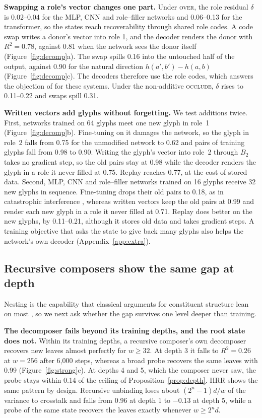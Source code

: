 \documentclass[10pt]{article}
\theoremstyle{plain}
\theoremstyle{remark}
\begin{document}
\textbf{Swapping a role's vector changes one part.} Under \textsc{over}, the role residual $\delta$ is 0.02--0.04 for the MLP, CNN and role--filler networks and 0.06--0.13 for the transformer, so the states reach recoverability through shared role codes. A code swap writes a donor's vector into role 1, and the decoder renders the donor with $R^2 = 0.78$, against 0.81 when the network sees the donor itself (Figure~\ref{fig:decomp}a). The swap spills 0.16 into the untouched half of the output, against 0.90 for the natural direction $h(a', b') - h(a, b)$ (Figure~\ref{fig:decomp}c). The decoders therefore use the role codes, which answers the objection of \citet{fodor1990} for these systems. Under the non-additive \textsc{occlude}, $\delta$ rises to 0.11--0.22 and swaps spill 0.31.

\textbf{Written vectors add glyphs without forgetting.} We test additions twice. First, networks trained on 64 glyphs meet one new glyph in role~1 (Figure~\ref{fig:decomp}b). Fine-tuning on it damages the network, so the glyph in role~2 falls from 0.75 for the unmodified network to 0.62 and pairs of training glyphs fall from 0.98 to 0.90. Writing the glyph's vector into role~2 through $B_2$ takes no gradient step, so the old pairs stay at 0.98 while the decoder renders the glyph in a role it never filled at 0.75. Replay reaches 0.77, at the cost of stored data. Second, MLP, CNN and role--filler networks trained on 16 glyphs receive 32 new glyphs in sequence. Fine-tuning drops their old pairs to 0.18, as in catastrophic interference \citep{mccloskey1989}, whereas written vectors keep the old pairs at 0.99 and render each new glyph in a role it never filled at 0.71. Replay does better on the new glyphs, by 0.11--0.21, although it stores old data and takes gradient steps. A training objective that asks the state to give back many glyphs also helps the network's own decoder (Appendix~\ref{app:extra}).

\subsection{Recursive composers show the same gap at depth}
\label{sec:depth}

Nesting is the capability that classical arguments for constituent structure lean on most \citep{fodor1988}, so we next ask whether the gap survives one level deeper than training.

\textbf{The decomposer fails beyond its training depths, and the root state does not.} Within its training depths, a recursive composer's own decomposer recovers new leaves almost perfectly for $w \ge 32$. At depth 3 it falls to $R^2 = 0.26$ at $w = 256$ after 6{,}000 steps, whereas a broad probe recovers the same leaves with 0.99 (Figure~\ref{fig:strong}c). At depths 4 and 5, which the composer never saw, the probe stays within 0.14 of the ceiling of Proposition~\ref{prop:depth}. HRR shows the same pattern by design. Recursive unbinding loses about $(2^n - 1)d/w$ of the variance to crosstalk and falls from 0.96 at depth 1 to $-0.13$ at depth 5, while a probe of the same state recovers the leaves exactly whenever $w \ge 2^n d$.
\end{document}
